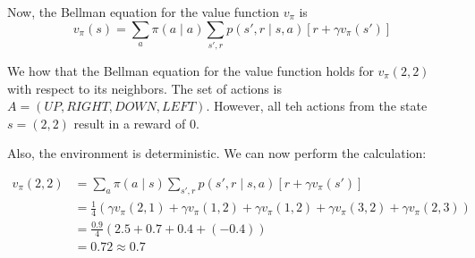 \documentclass[a4paper,11pt,reqno]{amsart}
\begin{document}
Now, the Bellman equation for the value function $v _{\pi }$ is
\[
    v _{\pi }(s) = \sum_{a} \pi (a \mid a) \sum_{s', r} p(s', r \mid s, a) \left[ r + \gamma v _{\pi }(s') \right] 
\]

We how that the Bellman equation for the value function holds for $v _{\pi }(2, 2)$ with respect to its neighbors. The set of actions is $A=(UP,  RIGHT, DOWN, LEFT)$. However, all teh actions from the state $s=(2, 2)$ result in a reward of $0$. 

Also, the environment is deterministic. We can now perform the calculation:

\begin{align}
    v _{\pi }(2, 2) &= \sum_{a} \pi(a \mid  s) \sum_{s', r} p(s', r \mid s, a) \left[ r + \gamma  v _{\pi }(s') \right] \\
    &= \frac{1}{4}(\gamma v _{\pi }(2, 1) + \gamma v _{\pi }(1, 2) + \gamma v _{\pi }(1, 2) + \gamma v _{\pi }(3, 2) + \gamma  v _{\pi } (2, 3))\\
    &= \frac{0.9}{4}(2.5 + 0.7 + 0.4 + (-0.4))\\
    &= 0.72 \approx 0.7
\end{align}

\section*{}
\end{document}
